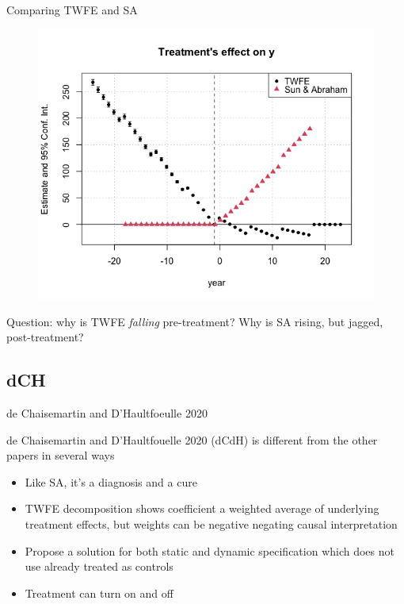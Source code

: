 \documentclass{beamer}
\begin{document}
\begin{frame}{Comparing TWFE and SA }

\begin{figure}
\begin{center}
             \includegraphics[scale=0.4]{./lecture_includes/twfe_sa_event}
\end{center}
\end{figure}

Question: why is TWFE \emph{falling} pre-treatment?  Why is SA rising, but jagged, post-treatment?

\end{frame}


\subsection{dCH}

\begin{frame}{de Chaisemartin and D'Haultfoeulle 2020}

de Chaisemartin and D'Haultfouelle 2020 (dCdH) is different from the other papers in several ways
	\begin{itemize}
	\item Like SA, it's a diagnosis and a cure
	\item TWFE decomposition shows coefficient a weighted average of underlying treatment effects, but weights can be negative negating causal interpretation
	\item Propose a solution for both static and dynamic specification which does not use already treated as controls
	\item Treatment can turn on and off
	\end{itemize}

\end{frame}
\end{document}
